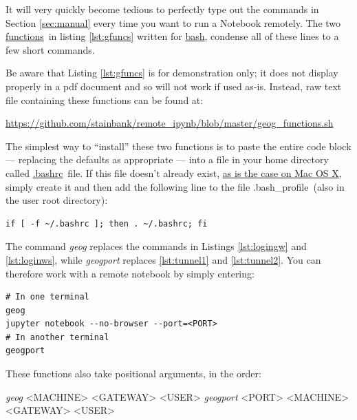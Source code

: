 \documentclass[a4paper]{article}
\begin{document}
It will very quickly become tedious to perfectly type out the commands in Section \ref{sec:manual} every time you want to run a Notebook remotely.
The two \href{https://www.shellscript.sh/functions.html}{functions}~in listing
\ref{lst:gfuncs} written for \href{http://cs.lmu.edu/~ray/notes/bash/}{bash}, condense all of these lines to a few short commands.



Be aware that Listing \ref{lst:gfuncs} is for demonstration only; it does not display properly in a pdf document and so will not work if used as-is.
Instead, raw text file containing these functions can be found at:

\noindent\small\url{https://github.com/stainbank/remote_ipynb/blob/master/geog_functions.sh}

The simplest way to ``install'' these two functions is to paste the entire code block --- replacing the defaults as appropriate --- into a file in your home directory called \href{http://superuser.com/questions/49289/what-is-the-bashrc-file}{.bashrc}~file.
If this file doesn't already exist, \href{http://apple.stackexchange.com/a/119714}{as is the case on Mac OS X}, simply create it and then add the following line to the file .bash\_profile~(also in the user root directory):

\begin{lstlisting}[caption={Source .bashrc on startup}, label={lst:srcbashrc}]
if [ -f ~/.bashrc ]; then . ~/.bashrc; fi
\end{lstlisting}

The command \emph{geog} replaces the commands in Listings \ref{lst:logingw} and \ref{lst:loginws}, while \emph{geogport} replaces \ref{lst:tunnel1} and \ref{lst:tunnel2}.
You can therefore work with a remote notebook by simply entering:
\begin{lstlisting}[caption={Set up and tunnel to remote Notebook server}, label={lst:usegfuncs}]
# In one terminal
geog
jupyter notebook --no-browser --port=<PORT>
# In another terminal
geogport
\end{lstlisting}

These functions also take positional arguments, in the order:

\emph{geog} \textless{}MACHINE\textgreater{} \textless{}GATEWAY\textgreater{} \textless{}USER\textgreater{}
\emph{geogport} \textless{}PORT\textgreater{} \textless{}MACHINE\textgreater{} \textless{}GATEWAY\textgreater{} \textless{}USER\textgreater{}
\end{document}
